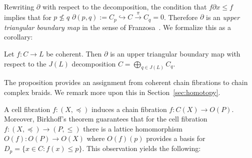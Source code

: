  
 
 
 Rewriting $\partial$ with respect to the decomposition, the condition that $f\partial x \leq f$ implies that for $p\not\leq q$ $\partial(p,q):=C_p\hookrightarrow C \xrightarrow{\pi} C_q =0$.   Therefore $\partial$ is an {\em upper triangular boundary map} in the sense of Franzosa~\cite[Definition 3.1]{fran}.   We formalize this as a corollary:


 
 
 
 \begin{cor}\label{cor:ccf:ut}
 Let $f:C\to L$ be coherent.  Then $\partial$ is an upper triangular boundary map with respect to the $J(L)$ decomposition $C=\bigoplus_{q\in J(L)}C_q$.
 \end{cor}

%
%
%
%
%

 The proposition provides an assignment from coherent chain fibrations to chain complex braids.  We remark more upon this in Section~\ref{sec:homotopy}.


A cell fibration $f:(X,\preceq)$ induces a chain fibration $f:C(X)\to O(P)$.  Moreover, Birkhoff's theorem guarantees that for the cell fibration $f:(X,\preceq)\to (P,\leq)$ there is a lattice homomorphism $O(f):O(P)\to O(X)$ where $O(f)(p)$ provides a basis for $D_p=\{x\in C:f(x)\leq p \}$.  This observation yields the following:

